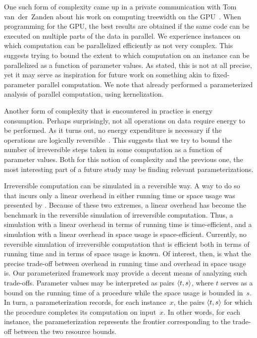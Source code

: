 One such form of complexity came up in a private communication with Tom van~der~Zanden about his work on computing treewidth on the GPU~\parencite{vanderzanden2018computing}.
When programming for the GPU, the best results are obtained if the same code can be executed on multiple parts of the data in parallel.
We experience instances on which computation can be parallelized efficiently as not very complex.
This suggests trying to bound the extent to which computation on an instance can be parallelized as a function of parameter values.
As stated, this is not at all precise, yet it may serve as inspiration for future work on something akin to fixed-parameter parallel computation.
We note that \textcite{weller2013aspects} already performed a parameterized analysis of parallel computation, using kernelization.

Another form of complexity that is encountered in practice is energy consumption.
Perhaps surprisingly, not all operations on data require energy to be performed.
As it turns out, no energy expenditure is necessary if the operations are logically reversible~\parencite[Section~8.2]{li2008introduction}.
This suggests that we try to bound the number of irreversible steps taken in some computation as a function of parameter values.
Both for this notion of complexity and the previous one, the most interesting part of a future study may be finding relevant parameterizations.

Irreversible computation can be simulated in a reversible way.
A way to do so that incurs only a linear overhead in either running time or space usage was presented by \textcite{buhrman2001time}.
Because of these two extremes, a linear overhead has become the benchmark in the reversible simulation of irreversible computation.
Thus, a simulation with a linear overhead in terms of running time is time-efficient, and a simulation with a linear overhead in space usage is space-efficient.
Currently, no reversible simulation of irreversible computation that is efficient both in terms of running time and in terms of space usage is known.
Of interest, then, is what the precise trade-off between overhead in running time and overhead in space usage is.
Our parameterized framework may provide a decent means of analyzing such trade-offs.
Parameter values may be interpreted as pairs ${\langle t, s\rangle}$, where $t$ serves as a bound on the running time of a procedure while the space usage is bounded in~$s$.
In turn, a parameterization records, for each instance~$x$, the pairs ${\langle t, s\rangle}$ for which the procedure completes its computation on input~$x$.
In other words, for each instance, the parameterization represents the frontier corresponding to the trade-off between the two resource bounds.

